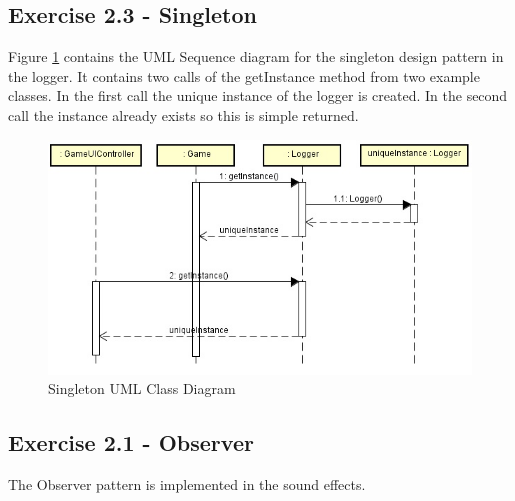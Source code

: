 \subsection{Exercise 2.3 - Singleton}
Figure \ref{fig:2-3singleton} contains the UML Sequence diagram for the singleton design pattern in the logger. It contains two calls of the getInstance method from two example classes. In the first call the unique instance of the logger is created. In the second call the instance already exists so this is simple returned. 

\begin{figure}[ht!]
\centering
\includegraphics[width=13cm]{loggerSequence.jpg}
\caption{Singleton UML Class Diagram}
\label{fig:2-3singleton}
\end{figure}
\subsection{Exercise 2.1 - Observer}
The Observer pattern is implemented in the sound effects.

